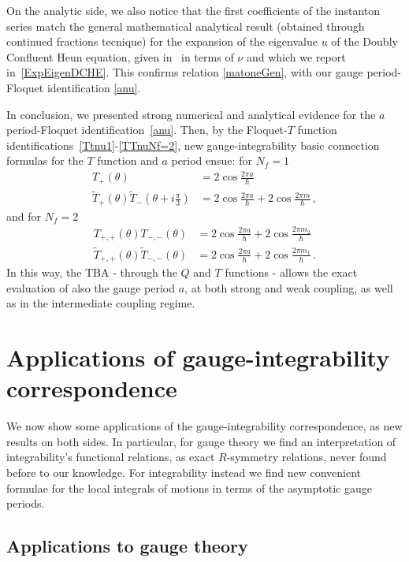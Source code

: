 \documentclass[11pt,a4paper]{elsarticle}
\def \th {\theta}
\def \ba {\begin{aligned}}
\def \ea {\end{aligned}}
\newcommand{\be}{\begin{equation}}
\newcommand{\ee}{\end{equation}}
\def\th{\theta}
\numberwithin{figure}{section}
\numberwithin{table}{section}
\begin{document}
On the analytic side, we also notice that the first coefficients of the instanton series match the general mathematical analytical result (obtained through continued fractions tecnique) for the expansion of the eigenvalue $u$ of the Doubly Confluent Heun equation, given in~\cite{Ronveaux:1995} in terms of $\nu$ and which we report in~\eqref{ExpEigenDCHE}. This confirms relation \eqref{matoneGen}, with our gauge period-Floquet identification \eqref{anu}.

In conclusion, we presented strong numerical and analytical evidence for the $a$ period-Floquet identification~\eqref{anu}.  Then, by the Floquet-$T$ function identifications~\eqref{Ttnu1}-\eqref{TTnuNf=2}, new gauge-integrability basic connection formulas for the $T$ function and $a$ period ensue: for $N_f=1$
\be  \label{Ta1}
\ba
T_{+}(\th)&=2 \cos \frac{2 \pi  a}{\hbar}\\
\tilde{T}_{+}(\th )\tilde{T}_{-}(\th+i\frac{\pi}{3})&=2 \cos  \frac{2\pi  a}{\hbar} + 2 \cos \frac{2 \pi m}{\hbar} \,,
\ea
\ee 
and for $N_f=2$
\be \label{TTa2}
\ba
T_{+,+}(\th)T_{-,-}(\th)&=2 \cos  \frac{2 \pi  a}{\hbar} + 2 \cos \frac{2 \pi m_2}{\hbar} \\
 \tilde{T}_{+,+}(\th )\tilde{T}_{-,-}(\th)&=2 \cos  \frac{2\pi  a}{\hbar} + 2 \cos \frac{2 \pi m_1 }{\hbar}\,.
\ea
\ee 
In this way, the TBA - through the $Q$ and $T$ functions - allows the exact evaluation of also the gauge period $a$, at both strong and weak coupling, as well as in the intermediate coupling regime.


\section{Applications of gauge-integrability correspondence} \label{applications}


We now show some applications of the gauge-integrability correspondence, as new results on both sides. In particular, for gauge theory we find an interpretation of integrability's functional relations, as exact $R$-symmetry relations, never found before to our knowledge. For integrability instead we find new convenient formulae for the local integrals of motions in terms of the asymptotic gauge periods.

\subsection{Applications to gauge theory}

%
\end{document}

